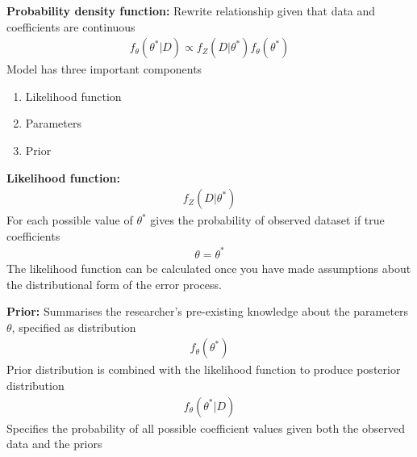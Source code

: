 \documentclass{beamer}
\begin{document}
\begin{frame}
  \textbf{Probability density function:} Rewrite relationship given that data and coefficients are continuous  
  \begin{align}
    f_\theta(\theta^* | D) \propto f_Z(D | \theta^*)f_\theta(\theta^*)
\end{align}
 Model has three important components
 \begin{enumerate}
   \item Likelihood function
   \item Parameters
   \item Prior
 \end{enumerate}  
\end{frame}

\begin{frame}
  \textbf{Likelihood function:} 
  \begin{align}
    f_Z(D | \theta^*)
  \end{align}
    For each possible value of $\theta^*$ gives the probability of observed dataset if true coefficients
    \begin{align}
      \theta= \theta^*
    \end{align}    
    The likelihood function can be calculated once you have made assumptions about the distributional form of the error process.    
\end{frame}

\begin{frame}
  \textbf{Prior:} Summarises the researcher's pre-existing knowledge about the parameters $\theta$, specified as distribution 
  \begin{align}
    f_\theta(\theta^*)
  \end{align}
  Prior distribution is combined with the likelihood function to produce posterior distribution
    \begin{align}
      f_\theta(\theta^* | D)
    \end{align}
    Specifies the probability of all possible coefficient values given both the observed data and the priors    
\end{frame}
\end{document}
